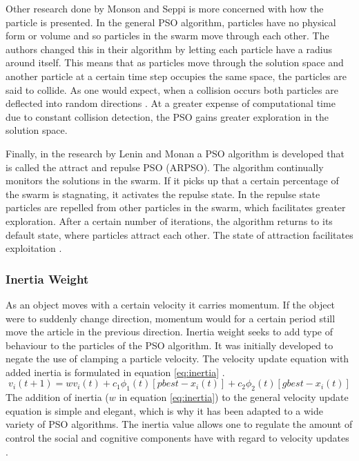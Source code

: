 Other research done by Monson and Seppi \cite{adaptPSO} is more concerned with how the particle is presented. In the general PSO algorithm, particles have no physical form or volume and so particles in the swarm move through each other. The authors changed this in their algorithm by letting each particle have a radius around itself. This means that as particles move through the solution space and another particle at a certain time step occupies the same space, the particles are said to collide. As one would expect, when a collision occurs both particles are deflected into random directions \cite{adaptPSO}. At a greater expense of computational time due to constant collision detection, the PSO gains greater exploration in the solution space. 

Finally, in the research by Lenin and Monan a PSO algorithm is developed that is called the attract and repulse PSO (ARPSO). The algorithm continually monitors the solutions in the swarm. If it picks up that a certain percentage of the swarm is stagnating, it activates the repulse state. In the repulse state particles are repelled from other particles in the swarm, which facilitates greater exploration. After a certain number of iterations, the algorithm returns to its default state, where particles attract each other. The state of attraction facilitates exploitation \cite{PSOAttractRepulse}.
\subsubsection{Inertia Weight}
As an object moves with a certain velocity it carries momentum. If the object were to suddenly change direction, momentum would for a certain period still move the article in the previous direction. Inertia weight seeks to add type of behaviour to the particles of the PSO algorithm. It was initially developed to negate the use of clamping a particle velocity. The velocity update equation with added inertia is formulated in equation \ref{eq:inertia} \cite{FundamentalSwarm}.
\begin{equation}
v_i(t+1) = wv_i(t) + c_1\phi_{1}(t)[pbest - x_i(t)] + c_2\phi_{2}(t)[gbest - x_i(t)]\label{eq:inertia}
\end{equation}
The addition of inertia ($w$ in equation \ref{eq:inertia}) to the general velocity update equation is simple and elegant, which is why it has been adapted to a wide variety of PSO algorithms. The inertia value allows one to regulate the amount of control the social and cognitive components have with regard to velocity updates \cite{FundamentalSwarm}. 

